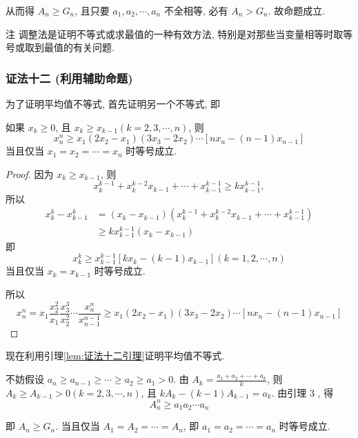从而得 $A_{n} \geqslant G_{n}$, 且只要 $a_{1}, a_{2}, \cdots, a_{n}$ 不全相等, 必有 $A_{n}>G_{n}$. 故命题成立.

注 调整法是证明不等式或求最值的一种有效方法, 特别是对那些当变量相等时取等号或取到最值的有关问题.

\subsubsection*{证法十二 (利用辅助命题)}

为了证明平均值不等式, 首先证明另一个不等式, 即

\begin{lemma}\label{lem:证法十二引理}
如果 $x_{k} \geqslant 0$, 且 $x_{k} \geqslant x_{k-1}(k=2,3, \cdots, n)$, 则
$$
x_{n}^{n} \geqslant x_{1}\left(2 x_{2}-x_{1}\right)\left(3 x_{3}-2 x_{2}\right) \cdots\left[n x_{n}-(n-1) x_{n-1}\right]
$$
当且仅当 $x_{1}=x_{2}=\cdots=x_{n}$ 时等号成立.
\end{lemma}
\begin{proof}
因为 $x_{k} \geqslant x_{k-1}$, 则
$$
x_{k}^{k-1}+x_{k}^{k-2} x_{k-1}+\cdots+x_{k-1}^{k-1} \geqslant k x_{k-1}^{k-1},
$$
所以
$$
\begin{aligned}
x_{k}^{k}-x_{k-1}^{k} & =\left(x_{k}-x_{k-1}\right)\left(x_{k}^{k-1}+x_{k}^{k-2} x_{k-1}+\cdots+x_{k-1}^{k-1}\right) \\
& \geqslant k x_{k-1}^{k-1}\left(x_{k}-x_{k-1}\right)
\end{aligned}
$$
即
$$
x_{k}^{k} \geqslant x_{k-1}^{k-1}\left[k x_{k}-(k-1) x_{k-1}\right](k=1,2, \cdots, n)
$$
当且仅当 $x_{k}=x_{k-1}$ 时等号成立.

所以
$$
x_{n}^{n}=x_{1} \frac{x_{2}^{2}}{x_{1}} \frac{x_{3}^{3}}{x_{2}^{2}} \cdots \frac{x_{n}^{n}}{x_{n-1}^{n-1}} \geqslant x_{1}\left(2 x_{2}-x_{1}\right)\left(3 x_{3}-2 x_{2}\right) \cdots\left[n x_{n}-(n-1) x_{n-1}\right]
$$
\end{proof}

现在利用引理\ref{lem:证法十二引理}证明平均值不等式.

不妨假设 $a_{n} \geqslant a_{n-1} \geqslant \cdots \geqslant a_{2} \geqslant a_{1}>0$. 由 $A_{k}=\frac{a_{1}+a_{2}+\cdots+a_{k}}{k}$, 则 $A_{k} \geqslant A_{k-1}>0(k=2,3, \cdots, n)$, 且 $k A_{k}-(k-1) A_{k-1}=a_{k}$. 由引理 3 , 得
$$
A_{n}^{n} \geqslant a_{1} a_{2} \cdots a_{n}
$$

即 $A_{n} \geqslant G_{n}$. 当且仅当 $A_{1}=A_{2}=\cdots=A_{n}$, 即 $a_{1}=a_{2}=\cdots=a_{n}$ 时等号成立.


